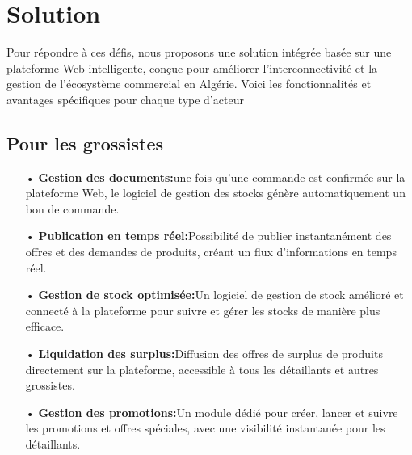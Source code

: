 \documentclass[edit,12pt,a4paper,ChapStyle,oneside,doubleinterligne]{report}
\begin{document}
\section{Solution}
Pour répondre à ces défis, nous proposons une solution intégrée basée sur une plateforme Web intelligente, conçue pour améliorer l'interconnectivité et la gestion de l'écosystème commercial en Algérie. Voici les fonctionnalités et avantages spécifiques pour chaque type d'acteur
\subsection{Pour les grossistes}
\begin{itemize}
    \item [•] \textbf{Gestion des documents:}une fois qu'une commande est confirmée sur la plateforme Web, le logiciel de gestion des stocks génère automatiquement un bon de commande.
    \item [•] \textbf{Publication en temps réel:}Possibilité de publier instantanément des offres et des demandes de produits, créant un flux d'informations en temps réel.
    \item [•] \textbf{Gestion de stock optimisée:}Un logiciel de gestion de stock amélioré et connecté à la plateforme pour suivre et gérer les stocks de manière plus efficace.
    \item [•] \textbf{Liquidation des surplus:}Diffusion des offres de surplus de produits directement sur la plateforme, accessible à tous les détaillants et autres grossistes.
    \item [•] \textbf{Gestion des promotions:}Un module dédié pour créer, lancer et suivre les promotions et offres spéciales, avec une visibilité instantanée pour les détaillants.
\end{itemize}
\end{document}
